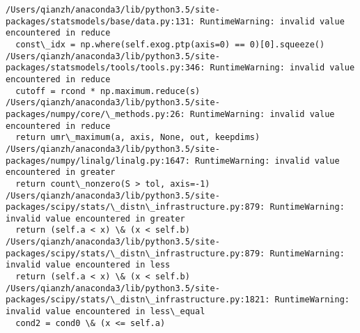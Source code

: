 \documentclass[11pt]{article}
\begin{document}
    \begin{Verbatim}[commandchars=\\\{\}]
/Users/qianzh/anaconda3/lib/python3.5/site-packages/statsmodels/base/data.py:131: RuntimeWarning: invalid value encountered in reduce
  const\_idx = np.where(self.exog.ptp(axis=0) == 0)[0].squeeze()
/Users/qianzh/anaconda3/lib/python3.5/site-packages/statsmodels/tools/tools.py:346: RuntimeWarning: invalid value encountered in reduce
  cutoff = rcond * np.maximum.reduce(s)
/Users/qianzh/anaconda3/lib/python3.5/site-packages/numpy/core/\_methods.py:26: RuntimeWarning: invalid value encountered in reduce
  return umr\_maximum(a, axis, None, out, keepdims)
/Users/qianzh/anaconda3/lib/python3.5/site-packages/numpy/linalg/linalg.py:1647: RuntimeWarning: invalid value encountered in greater
  return count\_nonzero(S > tol, axis=-1)
/Users/qianzh/anaconda3/lib/python3.5/site-packages/scipy/stats/\_distn\_infrastructure.py:879: RuntimeWarning: invalid value encountered in greater
  return (self.a < x) \& (x < self.b)
/Users/qianzh/anaconda3/lib/python3.5/site-packages/scipy/stats/\_distn\_infrastructure.py:879: RuntimeWarning: invalid value encountered in less
  return (self.a < x) \& (x < self.b)
/Users/qianzh/anaconda3/lib/python3.5/site-packages/scipy/stats/\_distn\_infrastructure.py:1821: RuntimeWarning: invalid value encountered in less\_equal
  cond2 = cond0 \& (x <= self.a)

    \end{Verbatim}


    
    
    
    
\end{document}
